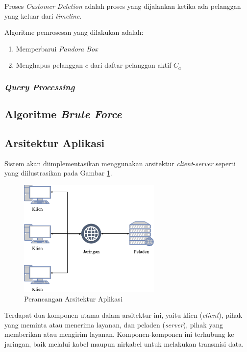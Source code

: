 
Proses \textit{Customer Deletion} adalah proses yang dijalankan ketika ada pelanggan yang keluar dari \textit{timeline}. 

Algoritme pemrosesan yang dilakukan adalah:
\begin{enumerate}
	\item Memperbarui \textit{Pandora Box}
	\item Menghapus pelanggan $c$ dari daftar pelanggan aktif $C_a$
\end{enumerate}

\subsubsection{\textit{Query Processing}}

\subsection{Algoritme \textit{Brute Force}}

\subsection{Arsitektur Aplikasi} 
\tab Sistem akan diimplementasikan menggunakan arsitektur \textit{client}-\textit{server} seperti yang diilustrasikan pada Gambar \ref{fig:arsitektur}. 

\begin{figure}[h]
	\centering
	\includegraphics[width=7cm]{bab3/img/arsitektur.png}
	\caption{Perancangan Arsitektur Aplikasi}
	\label{fig:arsitektur}
\end{figure}

Terdapat dua komponen utama dalam arsitektur ini, yaitu klien (\textit{client}), pihak yang meminta atau menerima layanan, dan peladen (\textit{server}), pihak yang memberikan atau mengirim layanan. Komponen-komponen ini terhubung ke jaringan, baik melalui kabel maupun nirkabel untuk melakukan transmisi data. 

